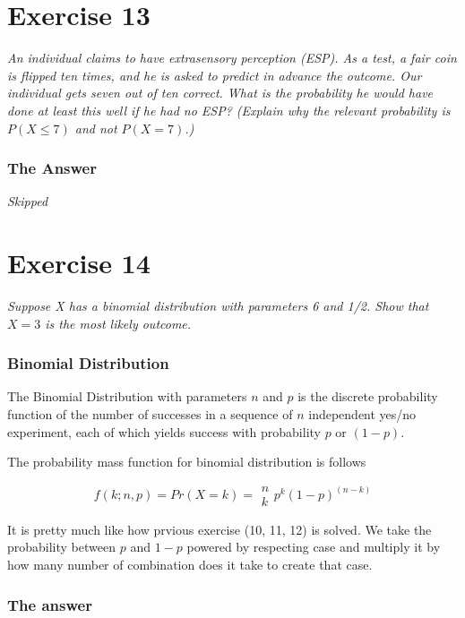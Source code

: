 \documentclass[12pt,a4paper]{article}
\begin{document}
\section{Exercise 13}

\textit{An individual claims to have extrasensory perception (ESP). As a test, a fair coin is flipped ten times, and he is asked to predict in advance the outcome. Our individual gets seven out of ten correct. What is the probability he would have done at least this well if he had no ESP? (Explain why the relevant probability is $P(X \leq 7)$ and not $P(X = 7)$.)}

\subsubsection {The Answer}


\textit{Skipped}

\section{Exercise 14}

\textit{Suppose X has a binomial distribution with parameters 6 and 1/2. Show that $X=3$ is the most likely outcome.}

\subsubsection{Binomial Distribution}

The Binomial Distribution with parameters $n$ and $p$ is the discrete probability function of the number of successes in a sequence of $n$ independent yes/no experiment, each of which yields success with probability $p$ or $(1-p)$. 

The probability mass function for binomial distribution is follows

\[
f(k; n, p) = Pr(X = k) = \begin{array}{c}n\\k\end{array}p^k(1-p)^{(n-k)}
\]

It is pretty much like how prvious exercise (10, 11, 12) is solved. We take the probability between $p$ and $1-p$ powered by respecting case and multiply it by how many number of combination does it take to create that case.

\subsubsection {The answer}
\end{document}
